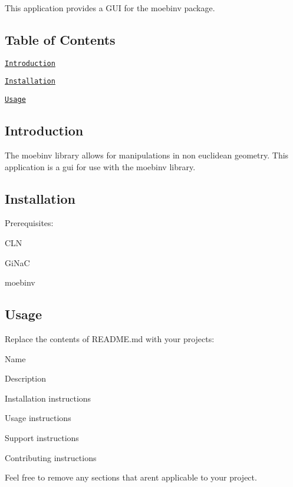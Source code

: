 This application provides a G\+UI for the moebinv package.

\subsection*{Table of Contents}


\begin{DoxyItemize}
\item \href{#introduction}{\tt Introduction}
\item \href{#installation}{\tt Installation}
\item \href{#usage}{\tt Usage}
\end{DoxyItemize}

\subsection*{Introduction}

The moebinv library allows for manipulations in non euclidean geometry. This application is a gui for use with the moebinv library.

\subsection*{Installation}

Prerequisites\+:
\begin{DoxyItemize}
\item C\+LN
\item Gi\+NaC
\item moebinv
\end{DoxyItemize}

\subsection*{Usage}

Replace the contents of {\ttfamily R\+E\+A\+D\+M\+E.\+md} with your project\textquotesingle{}s\+:


\begin{DoxyItemize}
\item Name
\item Description
\item Installation instructions
\item Usage instructions
\item Support instructions
\item Contributing instructions
\end{DoxyItemize}

Feel free to remove any sections that aren\textquotesingle{}t applicable to your project. 